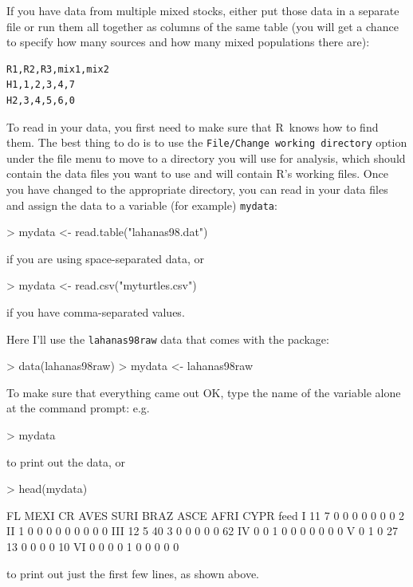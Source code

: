 \documentclass[11pt]{article}
\newcommand{\R}{{\sf R}}
\begin{document}
If you have data from multiple mixed stocks, either
put those data in a separate file or run them all
together as columns of the same table (you will
get a chance to specify how many sources and how
many mixed populations there are):
\begin{verbatim}
R1,R2,R3,mix1,mix2
H1,1,2,3,4,7
H2,3,4,5,6,0
\end{verbatim}

To read in your data,
you first need to make sure that \R\ knows how to
find them.
The best thing to do is to use the {\tt File/Change working directory}
option under the file menu to move to a directory you
will use for analysis, which should contain the data
files you want to use and will contain \R's working files.
Once you have changed to the appropriate directory,
you can read in your data files and assign the
data to a variable (for example) {\tt mydata}:
\begin{Schunk}
\begin{Sinput}
> mydata <- read.table("lahanas98.dat")
\end{Sinput}
\end{Schunk}
if you
are using space-separated data, or 
\begin{Schunk}
\begin{Sinput}
> mydata <- read.csv("myturtles.csv")
\end{Sinput}
\end{Schunk}
if you have comma-separated values.

Here I'll use the {\tt lahanas98raw}
data that comes with the package:
\begin{Schunk}
\begin{Sinput}
> data(lahanas98raw)
> mydata <- lahanas98raw
\end{Sinput}
\end{Schunk}

To make sure that everything came out OK, type
the name of the variable alone at the command prompt: e.g.
\begin{Schunk}
\begin{Sinput}
> mydata
\end{Sinput}
\end{Schunk}
to print out the data, or
\begin{Schunk}
\begin{Sinput}
> head(mydata)
\end{Sinput}
\begin{Soutput}
    FL MEXI CR AVES SURI BRAZ ASCE AFRI CYPR feed
I   11    7  0    0    0    0    0    0    0    2
II   1    0  0    0    0    0    0    0    0    0
III 12    5 40    3    0    0    0    0    0   62
IV   0    0  1    0    0    0    0    0    0    0
V    0    1  0   27   13    0    0    0    0   10
VI   0    0  0    0    1    0    0    0    0    0
\end{Soutput}
\end{Schunk}
to print out just the first few lines, as shown above.
\end{document}

